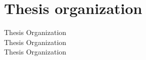
\section{Thesis organization}

Thesis Organization \\
Thesis Organization \\
Thesis Organization \\
